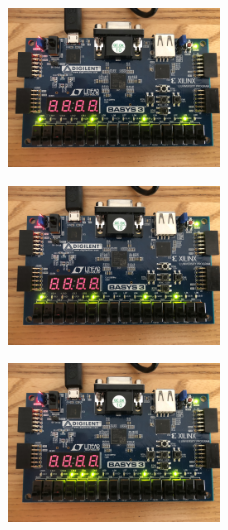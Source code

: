 \documentclass[11pt]{article}
\begin{document}
\begin{figure}[H]
\begin{center}
	\includegraphics[width=0.5\textwidth]{./images/Part1/l9p1img5.jpg}
	\caption{\label{fig:part1_img5}}
\end{center}
\end{figure}

\begin{figure}[H]
\begin{center}
	\includegraphics[width=0.5\textwidth]{./images/Part1/l9p1img6.jpg}
	\caption{\label{fig:part1_img6}}
\end{center}
\end{figure}

\begin{figure}[H]
\begin{center}
	\includegraphics[width=0.5\textwidth]{./images/Part1/l9p1img7.jpg}
	\caption{\label{fig:part1_img7}}
\end{center}
\end{figure}
\end{document}
